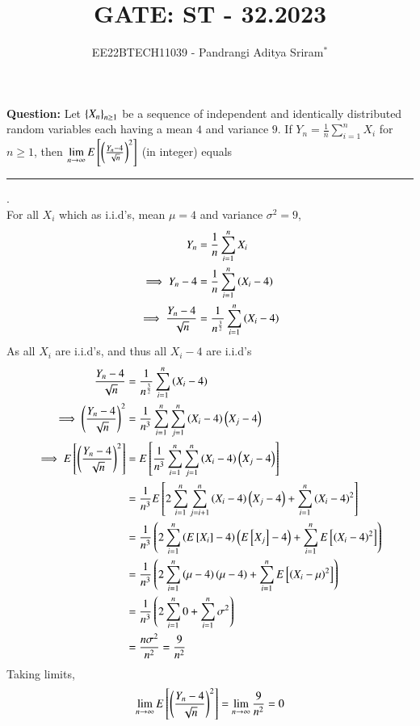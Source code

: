 \documentclass[journal,12pt,onecolumn]{IEEEtran}
\theoremstyle{remark}
\begin{document}

\vspace{3cm}

\title{GATE: ST - 32.2023}
\author{EE22BTECH11039 - Pandrangi Aditya Sriram$^{*}$%
}
\maketitle
\bigskip

\renewcommand{\thefigure}{\theenumi}
\renewcommand{\thetable}{\theenumi}


\vspace{3cm}
\textbf{Question:} Let $\left\{X_n\right\}_{n \geq 1}$ be a sequence of independent and identically distributed random variables each having a mean $4$ and variance $9$. If $Y_n = \frac{1}{n} \sum_{i=1}^{n} X_i$ for $n \geq 1$, then $\lim\limits_{n \to \infty} E{}\left[\left(\frac{Y_n - 4}{\sqrt{n}}\right)^2\right]$ (in integer) equals \rule{2cm}{0.1mm}.
\\
\solution
For all $X_i$ which as i.i.d's, mean $\mu = 4$ and variance $\sigma^2 = 9$,
\begin{align}
    Y_n &= \frac{1}{n} \sum_{i=1}^{n} X_i\\
    \implies Y_n - 4 &= \frac{1}{n} \sum_{i=1}^{n} \left(X_i - 4\right)\\
    \implies \frac{Y_n - 4}{\sqrt{n}} &= \frac{1}{n^{\frac{3}{2}}}\sum_{i=1}^{n} \left(X_i - 4\right)\\
\end{align} 
As all $X_i$ are i.i.d's, and thus all $X_i - 4$ are i.i.d's
\begin{align}
    \frac{Y_n - 4}{\sqrt{n}} &= \frac{1}{n^{\frac{3}{2}}}\sum_{i=1}^{n} \left(X_i - 4\right)\\
    \implies \left(\frac{Y_n - 4}{\sqrt{n}}\right)^2 &= \frac{1}{n^3} \sum_{i=1}^{n} \sum_{j=1}^{n} \left(X_i - 4\right)\left(X_j - 4\right)\\
    \implies E{}\left[\left(\frac{Y_n - 4}{\sqrt{n}}\right)^2\right] &= E{}\left[\frac{1}{n^3} \sum_{i=1}^{n} \sum_{j=1}^{n} \left(X_i - 4\right)\left(X_j - 4\right)\right]\\
    &= \frac{1}{n^3}E{}\left[2\sum_{i=1}^{n}\sum_{j=i+1}^{n} \left(X_i - 4\right)\left(X_j - 4\right) + \sum_{i=1}^n \left(X_i - 4\right)^2\right]\\
    &= \frac{1}{n^3}\left(2\sum_{i=1}^{n} \left(E{}\left[X_i\right] - 4\right)\left(E{}\left[X_j\right] - 4\right)+ \sum_{i=1}^{n} E{}\left[\left(X_i - 4\right)^2\right]\right)\\
    &= \frac{1}{n^3}\left(2\sum_{i=1}^{n} \left(\mu - 4\right)\left(\mu - 4\right)+ \sum_{i=1}^{n} E{}\left[\left(X_i - \mu\right)^2\right]\right)\\
    &= \frac{1}{n^3}\left(2\sum_{i=1}^{n} 0 + \sum_{i=1}^{n} \sigma^2\right)\\
    &= \frac{n\sigma^2}{n^2} = \frac{9}{n^2}
\end{align}
Taking limits,
\begin{align}
    \lim\limits_{n \to \infty} E{}\left[\left(\frac{Y_n - 4}{\sqrt{n}}\right)^2\right]
    = \lim\limits_{n \to \infty} \frac{9}{n^2} = 0
\end{align}
\end{document}
